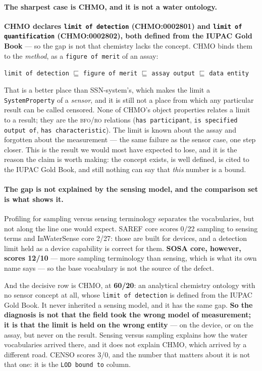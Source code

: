 \paragraph{The sharpest case is CHMO, and it is not a water ontology.}
\textbf{CHMO declares \texttt{limit of detection} (CHMO:0002801) and
\texttt{limit of quantification} (CHMO:0002802), both defined from the IUPAC
Gold Book} --- so the gap is not that chemistry lacks the concept. CHMO binds
them to the \emph{method}, as a \texttt{figure of merit} of an assay:

\begin{center}
\texttt{limit of detection} $\sqsubseteq$ \texttt{figure of merit} $\sqsubseteq$
\texttt{assay output} $\sqsubseteq$ \texttt{data entity}
\end{center}

\noindent That is a better place than SSN-system's, which makes the limit a
\texttt{SystemProperty} of a \emph{sensor}, and it is still not a place from
which any particular result can be called censored. None of CHMO's
object properties relates a limit to a result; they are the \textsc{bfo}/\textsc{ro}
relations (\texttt{has participant}, \texttt{is specified output of},
\texttt{has characteristic}). The limit is known about the assay and forgotten
about the measurement --- the same failure as the sensor case, one step closer.
This is the result we would most have expected to lose, and it is the reason the
claim is worth making: the concept exists, is well defined, is cited to the
IUPAC Gold Book, and still nothing can say that \emph{this} number is a bound.

\paragraph{The gap is not explained by the sensing model, and the comparison
set is what shows it.} Profiling for sampling versus sensing terminology
separates the vocabularies, but not along the line one would expect. SAREF core
scores \num{0}/\num{22} sampling to sensing terms and InWaterSense core
\num{2}/\num{27}: those are built for devices, and a detection limit held as a
device capability is correct for them. \textbf{SOSA core, however, scores
\num{12}/\num{10}} --- more sampling terminology than sensing, which is what
its own name says --- so the base vocabulary is not the source of the defect.

And the decisive row is CHMO, at \textbf{\num{60}/\num{20}}: an analytical
chemistry ontology with no sensor concept at all, whose \texttt{limit of
detection} is defined from the IUPAC Gold Book. It never inherited a sensing
model, and it has the same gap. \textbf{So the diagnosis is not that the field
took the wrong model of measurement; it is that the limit is held on the wrong
entity} --- on the device, or on the assay, but never on the result. Sensing
versus sampling explains how the water vocabularies arrived there, and it does
not explain CHMO, which arrived by a different road. CENSO scores
\num{3}/\num{0}, and the number that matters about it is not that one: it is
the \texttt{LOD bound to} column.


